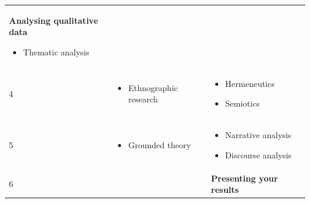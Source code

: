 \documentclass[]{book}
\providecommand{\tightlist}{%
  \setlength{\itemsep}{0pt}\setlength{\parskip}{0pt}}
\theoremstyle{definition}
\theoremstyle{definition}
\theoremstyle{definition}
\theoremstyle{remark}
\begin{document}
\begin{longtable}[]{@{}lll@{}}
\begin{minipage}[t]{0.54\columnwidth}
\textbf{Analysing qualitative data}

\begin{itemize}
\tightlist
\item
  Thematic analysis
\end{itemize}\strut
\end{minipage}\tabularnewline
\begin{minipage}[t]{0.08\columnwidth}\raggedright
4\strut
\end{minipage} & \begin{minipage}[t]{0.30\columnwidth}\raggedright
\begin{itemize}
\tightlist
\item
  Ethnographic research
\end{itemize}\strut
\end{minipage} & \begin{minipage}[t]{0.54\columnwidth}\raggedright
\begin{itemize}
\tightlist
\item
  Hermeneutics
\item
  Semiotics
\end{itemize}\strut
\end{minipage}\tabularnewline
\begin{minipage}[t]{0.08\columnwidth}\raggedright
5\strut
\end{minipage} & \begin{minipage}[t]{0.30\columnwidth}\raggedright
\begin{itemize}
\tightlist
\item
  Grounded theory
\end{itemize}\strut
\end{minipage} & \begin{minipage}[t]{0.54\columnwidth}\raggedright
\begin{itemize}
\tightlist
\item
  Narrative analysis
\item
  Discourse analysis
\end{itemize}\strut
\end{minipage}\tabularnewline
\begin{minipage}[t]{0.08\columnwidth}\raggedright
6\strut
\end{minipage} & \begin{minipage}[t]{0.30\columnwidth}\raggedright
\strut
\end{minipage} & \begin{minipage}[t]{0.54\columnwidth}\raggedright
\textbf{Presenting your results}\strut
\end{minipage}\tabularnewline
\bottomrule
\end{longtable}
\end{document}
